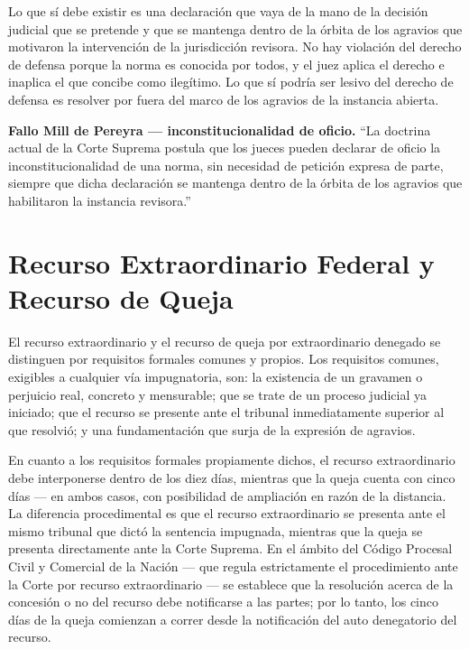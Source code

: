 \documentclass[12pt,oneside]{book}
\begin{document}
Lo que sí debe existir es una declaración que vaya de la mano de la decisión judicial que se pretende y que se mantenga dentro de la órbita de los agravios que motivaron la intervención de la jurisdicción revisora. No hay violación del derecho de defensa porque la norma es conocida por todos, y el juez aplica el derecho e inaplica el que concibe como ilegítimo. Lo que sí podría ser lesivo del derecho de defensa es resolver por fuera del marco de los agravios de la instancia abierta.

\begin{important}
\textbf{Fallo Mill de Pereyra --- inconstitucionalidad de oficio.} ``La doctrina actual de la Corte Suprema postula que los jueces pueden declarar de oficio la inconstitucionalidad de una norma, sin necesidad de petición expresa de parte, siempre que dicha declaración se mantenga dentro de la órbita de los agravios que habilitaron la instancia revisora.''
\end{important}

\section{Recurso Extraordinario Federal y Recurso de Queja}

El recurso extraordinario y el recurso de queja por extraordinario denegado se distinguen por requisitos formales comunes y propios. Los requisitos comunes, exigibles a cualquier vía impugnatoria, son: la existencia de un gravamen o perjuicio real, concreto y mensurable; que se trate de un proceso judicial ya iniciado; que el recurso se presente ante el tribunal inmediatamente superior al que resolvió; y una fundamentación que surja de la expresión de agravios.

En cuanto a los requisitos formales propiamente dichos, el recurso extraordinario debe interponerse dentro de los diez días, mientras que la queja cuenta con cinco días --- en ambos casos, con posibilidad de ampliación en razón de la distancia. La diferencia procedimental es que el recurso extraordinario se presenta ante el mismo tribunal que dictó la sentencia impugnada, mientras que la queja se presenta directamente ante la Corte Suprema. En el ámbito del Código Procesal Civil y Comercial de la Nación --- que regula estrictamente el procedimiento ante la Corte por recurso extraordinario --- se establece que la resolución acerca de la concesión o no del recurso debe notificarse a las partes; por lo tanto, los cinco días de la queja comienzan a correr desde la notificación del auto denegatorio del recurso.
\end{document}
